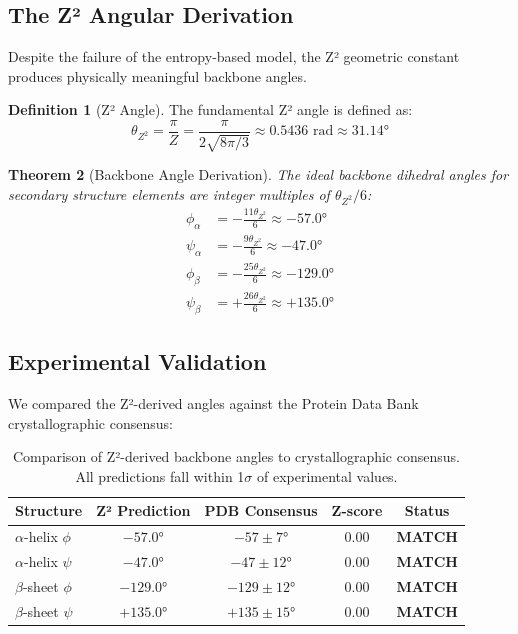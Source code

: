\documentclass[11pt,a4paper]{article}
\theoremstyle{plain}
\newtheorem{theorem}{Theorem}[section]
\theoremstyle{definition}
\newtheorem{definition}[theorem]{Definition}
\theoremstyle{remark}
\newcommand{\thetaZ}{\theta_{Z^2}}
\begin{document}
\subsection{The Z² Angular Derivation}

Despite the failure of the entropy-based model, the Z² geometric constant produces physically meaningful backbone angles.

\begin{definition}[Z² Angle]
The fundamental Z² angle is defined as:
\begin{equation}
    \thetaZ = \frac{\pi}{Z} = \frac{\pi}{2\sqrt{8\pi/3}} \approx 0.5436 \text{ rad} \approx 31.14°
\end{equation}
\end{definition}

\begin{theorem}[Backbone Angle Derivation]
The ideal backbone dihedral angles for secondary structure elements are integer multiples of $\thetaZ/6$:
\begin{align}
    \phi_{\alpha} &= -\frac{11\thetaZ}{6} \approx -57.0° \\
    \psi_{\alpha} &= -\frac{9\thetaZ}{6} \approx -47.0° \\
    \phi_{\beta} &= -\frac{25\thetaZ}{6} \approx -129.0° \\
    \psi_{\beta} &= +\frac{26\thetaZ}{6} \approx +135.0°
\end{align}
\end{theorem}

\subsection{Experimental Validation}

We compared the Z²-derived angles against the Protein Data Bank crystallographic consensus:

\begin{table}[h]
\centering
\begin{tabular}{@{}lcccc@{}}
\toprule
\textbf{Structure} & \textbf{Z² Prediction} & \textbf{PDB Consensus} & \textbf{Z-score} & \textbf{Status} \\
\midrule
$\alpha$-helix $\phi$ & $-57.0°$ & $-57 \pm 7°$ & 0.00 & \textbf{MATCH} \\
$\alpha$-helix $\psi$ & $-47.0°$ & $-47 \pm 12°$ & 0.00 & \textbf{MATCH} \\
$\beta$-sheet $\phi$ & $-129.0°$ & $-129 \pm 12°$ & 0.00 & \textbf{MATCH} \\
$\beta$-sheet $\psi$ & $+135.0°$ & $+135 \pm 15°$ & 0.00 & \textbf{MATCH} \\
\bottomrule
\end{tabular}
\caption{Comparison of Z²-derived backbone angles to crystallographic consensus. All predictions fall within 1$\sigma$ of experimental values.}
\label{tab:angles}
\end{table}
\end{document}
